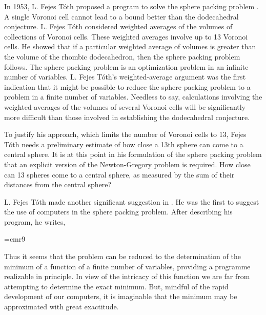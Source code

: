 In 1953, L. Fejes T\'oth proposed a program to solve the
sphere packing problem \cite{Fej53}.
A single Voronoi cell cannot lead to a bound better
than the dodecahedral conjecture.   L. Fejes T\'oth considered
weighted averages of the volumes of collections of Voronoi cells.
 These weighted
averages involve up to 13 Voronoi cells.  He showed that if a particular
weighted average of volumes is greater than the volume of the
rhombic dodecahedron, then the sphere packing problem follows.
The sphere packing problem is an optimization problem in an infinite
number of variables.  L. Fejes T\'oth's weighted-average argument
was the first indication that it might be possible to reduce
the sphere packing problem to a problem in a finite number of variables.
Needless to say, calculations involving the weighted averages of the
volumes of
several Voronoi cells will be significantly more difficult than those
involved in establishing the dodecahedral conjecture.

To justify his approach, which limits the number of Voronoi cells
to 13, Fejes T\'oth needs a preliminary estimate of how close
a 13th sphere can come to a central sphere.  It is at this point
in his formulation of the sphere packing problem that an explicit
version of the Newton-Gregory problem is required.  How
close can 13 spheres come to a central sphere, as measured by
the sum of their distances from the central sphere?


L. Fejes T\'oth made another significant suggestion in \cite{Fej64}.
He was the first to suggest the use of computers in the sphere packing problem.
After describing his program, he writes,

{
\narrower
\font\ninerm=cmr9
\ninerm

Thus it seems that the problem can be reduced to the determination
of the minimum of a function of a finite number of variables,
providing a programme realizable in principle.  In view of the
intricacy of this function we are far from attempting to
determine the exact minimum.  But, mindful of the rapid development
of our computers, it is imaginable that the minimum may
be approximated with great exactitude.

}

